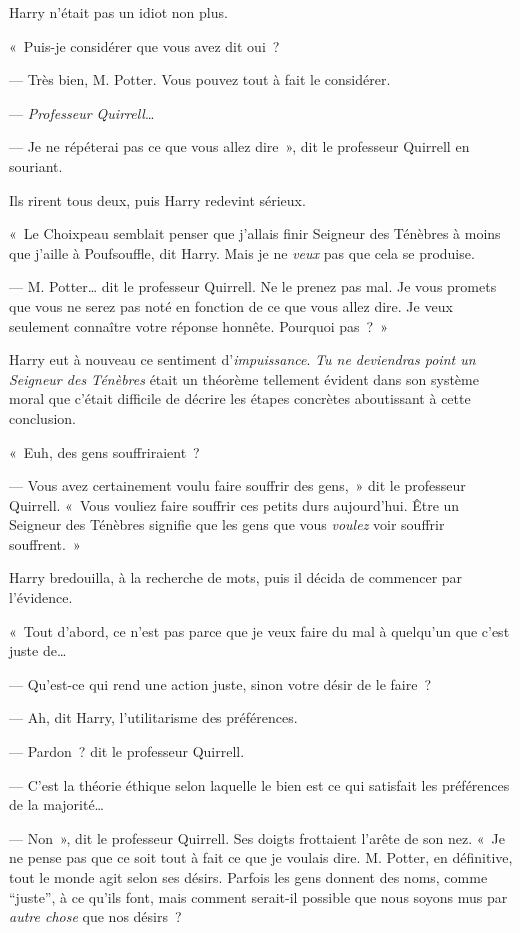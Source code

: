 Harry n'était pas un idiot non plus.

«~Puis-je considérer que vous avez dit oui~?

--- Très bien, M. Potter.
Vous pouvez tout à fait le considérer.

--- \emph{Professeur Quirrell}…

--- Je ne répéterai pas ce que vous allez dire~», dit le professeur Quirrell en souriant.

Ils rirent tous deux, puis Harry redevint sérieux.

«~Le Choixpeau semblait penser que j'allais finir Seigneur des Ténèbres à moins que j'aille à Poufsouffle, dit Harry.
Mais je ne \emph{veux} pas que cela se produise.

--- M. Potter… dit le professeur Quirrell.
Ne le prenez pas mal.
Je vous promets que vous ne serez pas noté en fonction de ce que vous allez dire.
Je veux seulement connaître votre réponse honnête.
Pourquoi pas~?~»

Harry eut à nouveau ce sentiment d'\emph{impuissance}.
\emph{Tu ne deviendras point un Seigneur des Ténèbres} était un théorème tellement évident dans son système moral que c'était difficile de décrire les étapes concrètes aboutissant à cette conclusion.

«~Euh, des gens souffriraient~?

--- Vous avez certainement voulu faire souffrir des gens,~» dit le professeur Quirrell.
«~Vous vouliez faire souffrir ces petits durs aujourd'hui.
Être un Seigneur des Ténèbres signifie que les gens que vous \emph{voulez} voir souffrir souffrent.~»

Harry bredouilla, à la recherche de mots, puis il décida de commencer par l'évidence.

«~Tout d'abord, ce n'est pas parce que je veux faire du mal à quelqu'un que c'est juste de…

--- Qu'est-ce qui rend une action juste, sinon votre désir de le faire~?

--- Ah, dit Harry, l'utilitarisme des préférences.

--- Pardon~? dit le professeur Quirrell.

--- C'est la théorie éthique selon laquelle le bien est ce qui satisfait les préférences de la majorité…

--- Non~», dit le professeur Quirrell.
Ses doigts frottaient l'arête de son nez.
«~Je ne pense pas que ce soit tout à fait ce que je voulais dire.
M. Potter, en définitive, tout le monde agit selon ses désirs.
Parfois les gens donnent des noms, comme “juste”, à ce qu'ils font, mais comment serait-il possible que nous soyons mus par \emph{autre chose} que nos désirs~?

